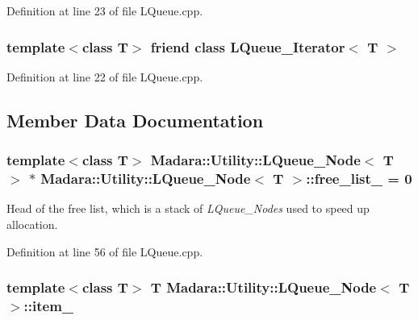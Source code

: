 Definition at line 23 of file LQueue.cpp.

\hypertarget{classMadara_1_1Utility_1_1LQueue__Node_a6b7cc6b02ab011daa89db3ab25c2d1c5}{
\subsubsection[{LQueue\_\-Iterator$<$ T $>$}]{\setlength{\rightskip}{0pt plus 5cm}template$<$class T$>$ friend class {\bf LQueue\_\-Iterator}$<$ T $>$}}
\label{da/d3c/classMadara_1_1Utility_1_1LQueue__Node_a6b7cc6b02ab011daa89db3ab25c2d1c5}


Definition at line 22 of file LQueue.cpp.



\subsection{Member Data Documentation}
\hypertarget{classMadara_1_1Utility_1_1LQueue__Node_a18ff36ca19cbdbc04ce11b8b20fe5fdf}{
\subsubsection[{free\_\-list\_\-}]{\setlength{\rightskip}{0pt plus 5cm}template$<$class T$>$ {\bf Madara::Utility::LQueue\_\-Node}$<$ T $>$ $\ast$ {\bf Madara::Utility::LQueue\_\-Node}$<$ T $>$::{\bf free\_\-list\_\-} = 0}}
\label{da/d3c/classMadara_1_1Utility_1_1LQueue__Node_a18ff36ca19cbdbc04ce11b8b20fe5fdf}


Head of the free list, which is a stack of {\itshape LQueue\_\-Nodes\/} used to speed up allocation. 



Definition at line 56 of file LQueue.cpp.

\hypertarget{classMadara_1_1Utility_1_1LQueue__Node_a2c49811b037ab88ab481460e13e9a660}{
\subsubsection[{item\_\-}]{\setlength{\rightskip}{0pt plus 5cm}template$<$class T$>$ T {\bf Madara::Utility::LQueue\_\-Node}$<$ T $>$::{\bf item\_\-}}}
\label{da/d3c/classMadara_1_1Utility_1_1LQueue__Node_a2c49811b037ab88ab481460e13e9a660}


